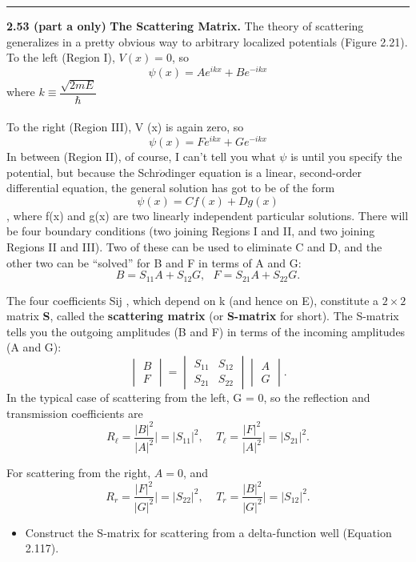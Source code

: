 \documentclass[fleqn]{article}
\begin{document}
  \rule{15cm}{1pt}

  \textbf{2.53 (part a only)}
  \textbf{The Scattering Matrix.} The theory of scattering generalizes in a pretty obvious way to
  arbitrary localized potentials (Figure 2.21). To the left (Region I), $V(x)=0$, so 
  $$\psi(x)=A e^{ikx}+B e^{-ikx}$$
  where $k\equiv \dfrac{\sqrt{2mE}}{\hbar}$
  \\
  \\
  To the right (Region III), V (x) is again zero, so 
  $$\psi(x)=F e^{ikx}+G e^{-ikx}$$ 
  In between (Region II), of course, I can’t tell you what $\psi$ is until you specify the potential, but
  because the Schr$\ddot{o}$dinger equation is a linear, second-order differential equation, the general
  solution has got to be of the form 
  $$\psi(x)=C f(x)+D g(x)$$,
  where f(x) and g(x) are two linearly independent particular solutions. There will be four
  boundary conditions (two joining Regions I and II, and two joining Regions II and III). Two of
  these can be used to eliminate C and D, and the other two can be “solved” for B and F in terms
  of A and G:
  $$B=S_{11} A+S_{12} G, ~~~ F=S_{21}A +S_{22} G.$$

  The four coefficients Sij , which depend on k (and hence on E), constitute a $2 \times 2$ matrix \textbf{S}, called
  the \textbf{scattering matrix} (or \textbf{S-matrix} for short). The S-matrix tells you the outgoing
  amplitudes (B and F) in terms of the incoming amplitudes (A and G):
  $$\begin{vmatrix}
    B \\
    F
  \end{vmatrix}=\begin{vmatrix}
    S_{11} & S_{12} \\
    S_{21} & S_{22}
  \end{vmatrix} \begin{vmatrix}
    A \\
    G
  \end{vmatrix}.$$
  In the typical case of scattering from the left, G = 0, so the reflection and transmission
  coefficients are 
  $$R_{\ell}=\dfrac{|B|^2}{|A|^2}\Big|=|S_{11}|^2, ~~~~~ T_{\ell}=\dfrac{|F|^2}{|A|^2}\Big|=|S_{21}|^2.$$

  For scattering from the right, $A=0$, and 
  $$R_r=\dfrac{|F|^2}{|G|^2}\Big|=|S_{22}|^2, ~~~~~ T_r=\dfrac{|B|^2}{|G|^2}\Big|=|S_{12}|^2.$$

  \begin{itemize}
    \item Construct the S-matrix for scattering from a delta-function well (Equation 2.117).

  \end{itemize}
\end{document}
